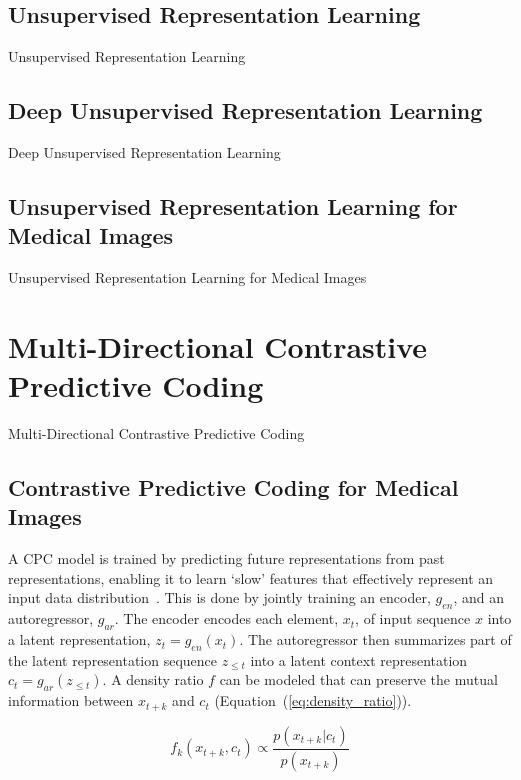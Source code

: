 \subsection{Unsupervised Representation Learning}
\label{subsec:unsupervised_representation}
Unsupervised Representation Learning

\subsection{Deep Unsupervised Representation Learning}
\label{subsec:unsupervised_deep_representation}
Deep Unsupervised Representation Learning

\subsection{Unsupervised Representation Learning for Medical Images}
\label{subsec:unsupervise_representation_for_medical}
Unsupervised Representation Learning for Medical Images



\section{Multi-Directional Contrastive Predictive Coding}
\label{sec:unsupervised_multi_directional_cpc}
Multi-Directional Contrastive Predictive Coding

\subsection{Contrastive Predictive Coding for Medical Images}
\label{subsec:unsupervised_cpc}
A CPC model is trained by predicting future representations from past representations, enabling it to learn `slow' features that effectively represent an input data distribution~\cite{henaff2019data,oord2018representation}. This is done by jointly training an encoder, \(g_{en}\), and an autoregressor, \(g_{ar}\). The encoder encodes each element, \(x_t\), of input sequence \(x\) into a latent representation, \(z_t = g_{en}(x_t)\). The autoregressor then summarizes part of the latent representation sequence \(z_{\le t}\) into a latent context representation \(c_t = g_{ar}(z_{\le t})\). A density ratio \(f\) can be modeled that can preserve the mutual information between \(x_{t+k}\) and \(c_t\) (Equation~(\ref{eq:density_ratio})).

\begin{equation}
	f_k(x_{t+k}, c_t) \propto \frac{p(x_{t+k}|c_t)}{p(x_{t+k})}
	\label{eq:density_ratio}
\end{equation}

